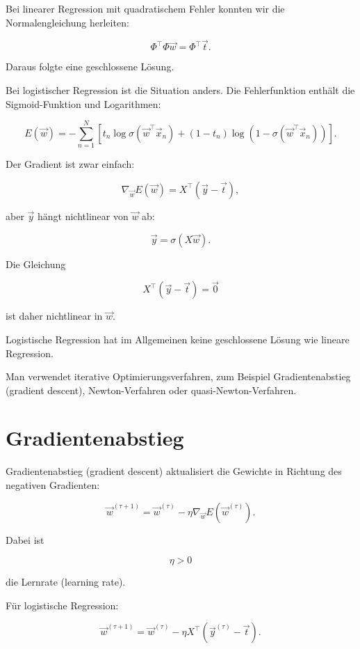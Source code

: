 Bei linearer Regression mit quadratischem Fehler konnten wir die Normalengleichung herleiten:

\[
    \Phi^{\top}\Phi\vec{w}
    =
    \Phi^{\top}\vec{t}.
\]

Daraus folgte eine geschlossene Lösung.

Bei logistischer Regression ist die Situation anders.
Die Fehlerfunktion enthält die Sigmoid-Funktion und Logarithmen:

\[
    E(\vec{w})
    =
    -\sum_{n=1}^{N}
    \left[
        t_n\log \sigma(\vec{w}^{\top}\vec{x}_n)
        +
        (1-t_n)\log(1-\sigma(\vec{w}^{\top}\vec{x}_n))
    \right].
\]

Der Gradient ist zwar einfach:

\[
    \nabla_{\vec{w}}E(\vec{w})
    =
    X^{\top}(\vec{y}-\vec{t}),
\]

aber \(\vec{y}\) hängt nichtlinear von \(\vec{w}\) ab:

\[
    \vec{y}
    =
    \sigma(X\vec{w}).
\]

Die Gleichung

\[
    X^{\top}(\vec{y}-\vec{t})
    =
    \vec{0}
\]

ist daher nichtlinear in \(\vec{w}\).

\begin{conceptbox}
Logistische Regression hat im Allgemeinen keine geschlossene Lösung wie lineare Regression.

Man verwendet iterative Optimierungsverfahren, zum Beispiel Gradientenabstieg (gradient descent), Newton-Verfahren oder quasi-Newton-Verfahren.
\end{conceptbox}

\section{Gradientenabstieg}

Gradientenabstieg (gradient descent) aktualisiert die Gewichte in Richtung des negativen Gradienten:

\[
    \vec{w}^{(\tau+1)}
    =
    \vec{w}^{(\tau)}
    -
    \eta
    \nabla_{\vec{w}}E(\vec{w}^{(\tau)}).
\]

Dabei ist

\[
    \eta>0
\]

die Lernrate (learning rate).

Für logistische Regression:

\[
    \vec{w}^{(\tau+1)}
    =
    \vec{w}^{(\tau)}
    -
    \eta
    X^{\top}
    (
        \vec{y}^{(\tau)}-\vec{t}
    ).
\]

